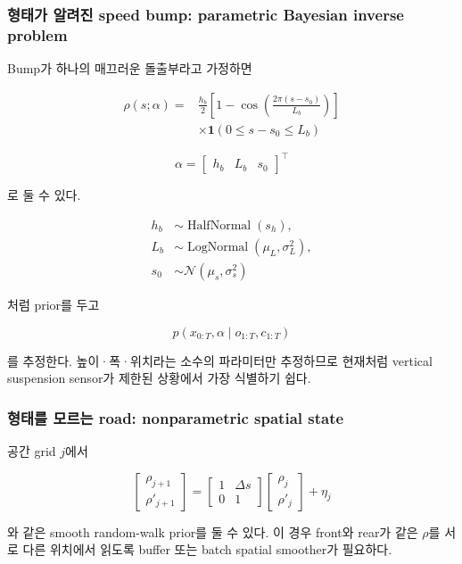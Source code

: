 \documentclass[letterpaper,10pt,journal,twocolumn]{ieeeconf}
\newcommand{\Normal}{\mathcal{N}}
\newcommand{\HalfNormal}{\operatorname{HalfNormal}}
\newcommand{\LogNormal}{\operatorname{LogNormal}}
\begin{document}
\subsubsection{형태가 알려진 speed bump: parametric Bayesian inverse problem}

Bump가 하나의 매끄러운 돌출부라고 가정하면

\[
\begin{aligned}
\rho(s;\alpha)
={}&
\frac{h_b}{2}
\left[
1-\cos\!\left(
\frac{2\pi(s-s_0)}{L_b}
\right)
\right]\\
&\times
\mathbf 1\!\left(0\le s-s_0\le L_b\right)
\end{aligned}
\]

\[
\alpha=
\begin{bmatrix}
h_b&L_b&s_0
\end{bmatrix}^{\top}
\]

로 둘 수 있다.

\[
\begin{aligned}
h_b &\sim\HalfNormal(s_h),\\
L_b &\sim\LogNormal(\mu_L,\sigma_L^2),\\
s_0 &\sim\Normal(\mu_s,\sigma_s^2)
\end{aligned}
\]

처럼 prior를 두고

\[
p(x_{0:T},\alpha\mid o_{1:T},c_{1:T})
\]

를 추정한다. 높이·폭·위치라는 소수의 파라미터만 추정하므로 현재처럼 vertical suspension sensor가 제한된 상황에서 가장 식별하기 쉽다.

\subsubsection{형태를 모르는 road: nonparametric spatial state}

공간 grid \(j\)에서

\[
\begin{bmatrix}
\rho_{j+1}\\
\rho'_{j+1}
\end{bmatrix}
=
\begin{bmatrix}
1&\Delta s\\
0&1
\end{bmatrix}
\begin{bmatrix}
\rho_j\\
\rho'_j
\end{bmatrix}
+\eta_j
\]

와 같은 smooth random-walk prior를 둘 수 있다. 이 경우 front와 rear가 같은 \(\rho\)를 서로 다른 위치에서 읽도록 buffer 또는 batch spatial smoother가 필요하다.
\end{document}
